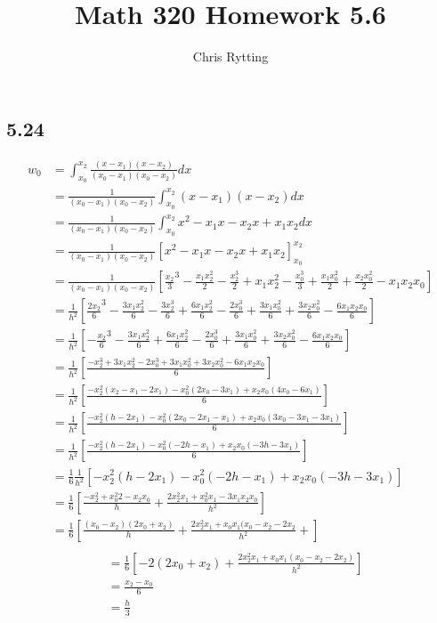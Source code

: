\documentclass[letterpaper,12pt]{article}
\theoremstyle{definition}
\begin{document}
\title{Math 320 Homework 5.6}
\author{Chris Rytting}
\maketitle

\subsection*{5.24}
\begin{align*}
    w_0 &= \int^{x_2}_{x_0} \frac{(x-x_1)(x-x_2)}{(x_0 - x_1)(x_0 - x_2)}dx 
    \\&= \frac{1}{(x_0 - x_1)(x_0 - x_2)}\int^{x_2}_{x_0}(x-x_1)(x-x_2) dx 
    \\&= \frac{1}{(x_0 - x_1)(x_0 - x_2)}\int^{x_2}_{x_0}x^2 - x_1 x - x_2 x + x_1 x_2 dx 
    \\&= \frac{1}{(x_0 - x_1)(x_0 - x_2)}\left[x^2 - x_1 x - x_2 x + x_1 x_2 \right]^{x_2}_{x_0}
    \\&= \frac{1}{(x_0 - x_1)(x_0 - x_2)}\left[\frac{x_2}{3}^3-  \frac{x_1x_2^2}{2} - \frac{x_2^3}{2} + x_1 x_2^2 - \frac{x_0^3}{3} + \frac{x_1 x_0^2}{2} + \frac{x_2 x_0^2}{2} - x_1x_2x_0\right]
    \\&= \frac{1}{h^2}\left[\frac{2x_2}{6}^3 - \frac{3x_1x_2^2}{6} - \frac{3x_2^3}{6} + \frac{6x_1 x_2^2}{6} - \frac{2x_0^3}{6} + \frac{3x_1 x_0^2}{6} + \frac{3x_2 x_0^2}{6} - \frac{6x_1x_2x_0}{6}\right]
    \\&= \frac{1}{h^2}\left[-\frac{x_2}{6}^3 - \frac{3x_1x_2^2}{6}  + \frac{6x_1 x_2^2}{6} - \frac{2x_0^3}{6} + \frac{3x_1 x_0^2}{6} + \frac{3x_2 x_0^2}{6} - \frac{6x_1x_2x_0}{6}\right]
    \\&= \frac{1}{h^2}\left[\frac{-x_2^3 + 3x_1x_2^2 - 2x_0^3 + 3x_1 x_0^2 + 3x_2 x_0^2 - 6x_1x_2x_0}{6}\right]
    \\&= \frac{1}{h^2}\left[\frac{-x_2^2(x_2 - x_1 - 2x_1) - x_0^2 (2x_0 - 3x_1) + x_2x_0(4x_0 - 6x_1)}{6}\right]
    \\&= \frac{1}{h^2}\left[\frac{-x_2^2(h - 2x_1) - x_0^2 (2x_0 - 2x_1 -x_1) + x_2x_0(3x_0 - 3x_1 - 3x_1)}{6}\right]
    \\&= \frac{1}{h^2}\left[\frac{-x_2^2(h - 2x_1) - x_0^2 (-2h -x_1) + x_2x_0(-3h - 3x_1)}{6}\right]
    \\&= \frac{1}{6}\frac{1}{h^2}\left[-x_2^2(h - 2x_1) - x_0^2 (-2h -x_1) + x_2x_0(-3h - 3x_1)\right]
    \\&= \frac{1}{6}\left[\frac{-x_2^2 + x_0^2 2 - x_2x_0 }{h} + \frac{2x_2^2x_1 + x_0^2x_1 - 3x_1x_2x_0}{h^2}\right]
    \\&= \frac{1}{6}\left[\frac{(x_0 - x_2)(2x_0 + x_2) }{h} + \frac{2x_2^2x_1 + x_0x_1(x_0 - x_2 - 2x_2}{h^2} + \right]
    \end{align*}
    \begin{align*}
    \\&= \frac{1}{6}\left[-2(2x_0 + x_2) + \frac{2x_2^2x_1  + x_0x_1(x_0 - x_2 - 2x_2)}{h^2}  \right]
    \\&= \frac{x_2 - x_0}{6}
    \\&= \frac{h}{3}
\end{align*}
\end{document}

